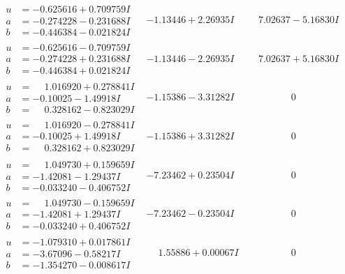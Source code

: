 \documentclass[1p]{elsarticle_modified}
\theoremstyle{definition}
\begin{document}
$$\begin{array}{c|c|c}
\begin{aligned}
u &= -0.625616 + 0.709759 I \\
a &= -0.274228 - 0.231688 I \\
b &= -0.446384 - 0.021824 I\end{aligned}
 & -1.13446 + 2.26935 I & \phantom{-}7.02637 - 5.16830 I \\ \hline\begin{aligned}
u &= -0.625616 - 0.709759 I \\
a &= -0.274228 + 0.231688 I \\
b &= -0.446384 + 0.021824 I\end{aligned}
 & -1.13446 - 2.26935 I & \phantom{-}7.02637 + 5.16830 I \\ \hline\begin{aligned}
u &= \phantom{-}1.016920 + 0.278841 I \\
a &= -0.10025 - 1.49918 I \\
b &= \phantom{-}0.328162 - 0.823029 I\end{aligned}
 & -1.15386 - 3.31282 I & \phantom{-0.000000 } 0 \\ \hline\begin{aligned}
u &= \phantom{-}1.016920 - 0.278841 I \\
a &= -0.10025 + 1.49918 I \\
b &= \phantom{-}0.328162 + 0.823029 I\end{aligned}
 & -1.15386 + 3.31282 I & \phantom{-0.000000 } 0 \\ \hline\begin{aligned}
u &= \phantom{-}1.049730 + 0.159659 I \\
a &= -1.42081 - 1.29437 I \\
b &= -0.033240 - 0.406752 I\end{aligned}
 & -7.23462 + 0.23504 I & \phantom{-0.000000 } 0 \\ \hline\begin{aligned}
u &= \phantom{-}1.049730 - 0.159659 I \\
a &= -1.42081 + 1.29437 I \\
b &= -0.033240 + 0.406752 I\end{aligned}
 & -7.23462 - 0.23504 I & \phantom{-0.000000 } 0 \\ \hline\begin{aligned}
u &= -1.079310 + 0.017861 I \\
a &= -3.67096 - 0.58217 I \\
b &= -1.354270 - 0.008617 I\end{aligned}
 & \phantom{-}1.55886 + 0.00067 I & \phantom{-0.000000 } 0 \\ \hline\begin{aligned}

\end{aligned}
\end{array}$$
\end{document}

